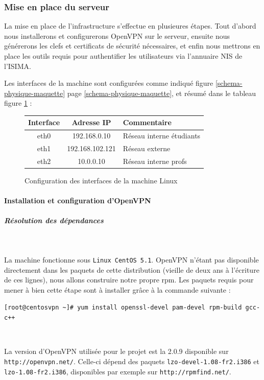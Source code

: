 \subsubsection{Mise en place du serveur}

La mise en place de l'infrastructure s'effectue en plusieures étapes. Tout d'abord nous installerons et configurerons OpenVPN sur le serveur, ensuite nous générerons les clefs et certificats de sécurité nécessaires, et enfin nous mettrons en place les outils requis pour authentifier les utilisateurs via l'annuaire NIS de l'ISIMA.

Les interfaces de la machine sont configurées comme indiqué figure \ref{schema-physique-maquette} page \ref{schema-physique-maquette}, et résumé dans le tableau figure \ref{linux_interfaces} :

\begin{figure}[H]
	\begin{center}
		\begin{tabular}{c|c|l}
			Interface & Adresse IP & Commentaire \\
			\hline
			eth0 & 192.168.0.10 & Réseau interne étudiants \\
			eth1 & 192.168.102.121 & Réseau externe \\
			eth2 & 10.0.0.10 & Réseau interne profs \\
		\end{tabular}
	\end{center}
	\caption{Configuration des interfaces de la machine Linux}
	\label{linux_interfaces}
\end{figure}


\paragraph{Installation et configuration d'OpenVPN}

\subparagraph{Résolution des dépendances}
~

La machine fonctionne sous \texttt{Linux CentOS 5.1}. OpenVPN n'étant pas disponible directement dans les paquets de cette distribution (vieille de deux ans à l'écriture de ces lignes), nous allons construire notre propre rpm. Les paquets requis pour mener à bien cette étape sont à installer grâce à la commande suivante :

\verb|[root@centosvpn ~]# yum install openssl-devel pam-devel rpm-build gcc-c++|

~

La version d'OpenVPN utilisée pour le projet est la 2.0.9 disponible sur \verb|http://openvpn.net/|. Celle-ci dépend des paquets \verb|lzo-devel-1.08-fr2.i386| et \verb|lzo-1.08-fr2.i386|, disponibles par exemple sur \verb|http://rpmfind.net/|.

